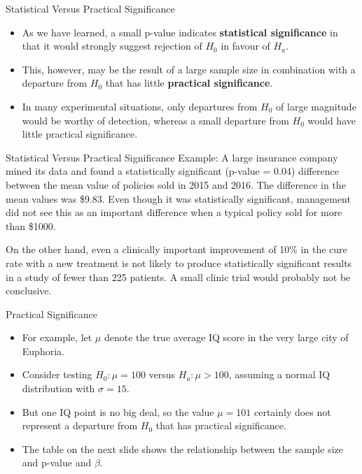 \documentclass[
  ignorenonframetext,
]{beamer}
\providecommand{\tightlist}{%
  \setlength{\itemsep}{0pt}\setlength{\parskip}{0pt}}\usepackage{longtable,booktabs,array}
\begin{document}
\begin{frame}{Statistical Versus Practical Significance}
\protect\hypertarget{statistical-versus-practical-significance}{}
\begin{itemize}[<+->]
\tightlist
\item
  As we have learned, a small p-value indicates \textbf{statistical
  significance} in that it would strongly suggest rejection of \(H_{0}\)
  in favour of \(H_{a}\).
\item
  This, however, may be the result of a large sample size in combination
  with a departure from \(H_{0}\) that has little \textbf{practical
  significance}.
\item
  In many experimental situations, only departures from \(H_{0}\) of
  large magnitude would be worthy of detection, whereas a small
  departure from \(H_{0}\) would have little practical significance.
\end{itemize}
\end{frame}

\begin{frame}{Statistical Versus Practical Significance}
\protect\hypertarget{statistical-versus-practical-significance-1}{}
Example: A large insurance company mined its data and found a
statistically significant (p-value = 0.04) difference between the mean
value of policies sold in 2015 and 2016. The difference in the mean
values was \$9.83. Even though it was statistically significant,
management did not see this as an important difference when a typical
policy sold for more than \$1000.

On the other hand, even a clinically important improvement of 10\% in
the cure rate with a new treatment is not likely to produce
statistically significant results in a study of fewer than 225 patients.
A small clinic trial would probably not be conclusive.
\end{frame}

\begin{frame}{Practical Significance}
\protect\hypertarget{practical-significance}{}
\begin{itemize}[<+->]
\tightlist
\item
  For example, let \(\mu\) denote the true average IQ score in the very
  large city of Euphoria.
\item
  Consider testing \(H_{0}: \mu = 100\) versus \(H_{a}: \mu > 100\),
  assuming a normal IQ distribution with \(\sigma = 15\).
\item
  But one IQ point is no big deal, so the value \(\mu = 101\) certainly
  does not represent a departure from \(H_{0}\) that has practical
  significance.
\item
  The table on the next slide shows the relationship between the sample
  size and p-value and \(\beta\).
\end{itemize}
\end{frame}
\end{document}
